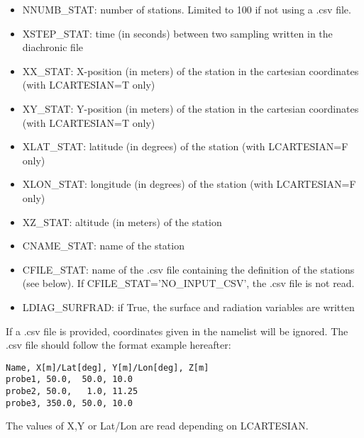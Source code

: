 \begin{itemize}
\item NNUMB\_STAT: number of stations. Limited to 100 if not using a .csv file.

\item XSTEP\_STAT: time (in seconds) between two sampling written in the diachronic file

\item XX\_STAT: X-position (in meters) of the station in the cartesian coordinates (with LCARTESIAN=T only)

\item XY\_STAT: Y-position (in meters) of the station in the cartesian coordinates (with LCARTESIAN=T only)

\item XLAT\_STAT: latitude (in degrees) of the station (with LCARTESIAN=F only)

\item XLON\_STAT: longitude (in degrees) of the station (with LCARTESIAN=F only)

\item XZ\_STAT: altitude (in meters) of the station

\item CNAME\_STAT: name of the station

\item CFILE\_STAT: name of the .csv file containing the definition of the stations (see below). If CFILE\_STAT='NO\_INPUT\_CSV', the .csv file is not read.

\item LDIAG\_SURFRAD: if True, the surface and radiation variables are written

\end{itemize}

If a .csv file is provided, coordinates given in the namelist will be ignored. The .csv file should follow the format example hereafter:
\begin{verbatim}
Name, X[m]/Lat[deg], Y[m]/Lon[deg], Z[m]
probe1, 50.0,  50.0, 10.0
probe2, 50.0,   1.0, 11.25
probe3, 350.0, 50.0, 10.0
\end{verbatim}
The values of X,Y or Lat/Lon are read depending on LCARTESIAN.

